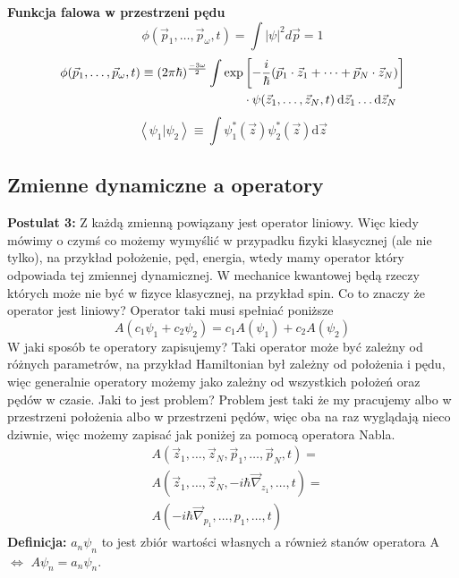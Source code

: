 \textbf{Funkcja falowa w przestrzeni pędu}
\begin{equation*}
	\phi (\vec{p}_1, \dots, \vec{p}_{\omega}, t) = \int |\psi|^2 d \vec{p} = 1
\end{equation*}
\begin{equation*}
	\begin{split}
		\phi (\vec{p}_1, \dots, \vec{p}_{\omega}, t) \equiv (2 \pi \hbar)^{\frac{-3\omega}{2}} \int \text{exp}&\left[ -\frac{i}{\hbar} (\vec{p}_1 \cdot \vec{z}_1 + \dots + \vec{p}_N \cdot \vec{z}_N)  \right] \\
		&\cdot \vspace{10cm}\psi(\vec{z}_1, \dots, \vec{z}_N, t) \hspace{2pt} \text{d}\vec{z}_1 \dots \text{d}\vec{z}_N
	\end{split}
\end{equation*}
\begin{equation*}
		\left< \psi_1 \vert \psi_2 \right> \equiv \int \psi_1^*(\vec{z}) \psi_2^*(\vec{z})\text{d}\vec{z}	
\end{equation*}
\subsection{Zmienne dynamiczne a operatory}
\textbf{Postulat 3:} Z każdą zmienną powiązany jest operator liniowy. 
Więc kiedy mówimy o czymś co możemy wymyślić w przypadku fizyki klasycznej (ale nie tylko), na przykład położenie, pęd, energia, wtedy mamy operator który odpowiada tej zmiennej dynamicznej. W mechanice kwantowej będą rzeczy których może nie być w fizyce klasycznej, na przykład spin. 
Co to znaczy że operator jest liniowy? Operator taki musi spełniać poniższe
\begin{equation*}
	A(c_1 \psi_1 + c_2 \psi_2) = c_1 A(\psi_1) + c_2 A(\psi_2)
\end{equation*}
W jaki sposób te operatory zapisujemy? Taki operator może być zależny od różnych parametrów, na przykład Hamiltonian był zależny od położenia i pędu, więc generalnie operatory możemy jako zależny od wszystkich położeń oraz pędów w czasie. Jaki to jest problem? Problem jest taki że my pracujemy albo w przestrzeni położenia albo w przestrzeni pędów, więc oba na raz wyglądają nieco dziwnie, więc możemy zapisać jak poniżej za pomocą operatora Nabla.
\begin{equation*}
	\begin{split}
		&A(\vec{z}_1, \dots, \vec{z}_N, \vec{p}_1, \dots, \vec{p}_N, t) = \\
		&A(\vec{z}_1, \dots, \vec{z}_N, -i \hbar \vec{\nabla}_{z_1}, \dots, t) = \\
		&A(-i \hbar \vec{\nabla}_{p_1}, \dots, p_1, \dots, t)
	\end{split}	
\end{equation*}
\textbf{Definicja:} ${a_n \psi}_n$ to jest zbiór wartości własnych a również stanów operatora A $\iff$ $A \psi_n = a_n \psi_n$.

